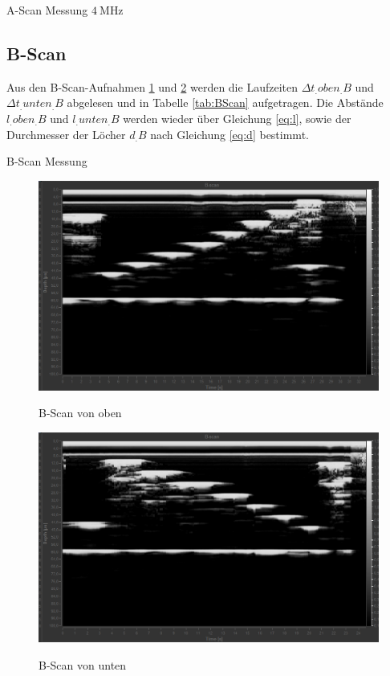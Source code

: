 \begin{table}
	\centering
	\caption{A-Scan Messung $\SI{4}{\mega\hertz}$}
	
	\label{tab:AScan4MHz}
\end{table}

\subsection{B-Scan}

Aus den B-Scan-Aufnahmen \ref{fig:B-Scan-oben} und \ref{fig:B-Scan-unten} werden die Laufzeiten $\Delta t_.{oben_.B}$ und $\Delta t_.{unten_.B}$ abgelesen und in Tabelle \ref{tab:BScan} aufgetragen. Die Abstände $l_.{oben_.B}$ und $l_.{unten_.B}$ werden wieder über Gleichung \eqref{eq:l}, sowie der Durchmesser der Löcher $d_.B$ nach Gleichung \eqref{eq:d} bestimmt.
\begin{table}
	\centering
	\caption{B-Scan Messung}
	
	\label{tab:BScan}
\end{table}

\begin{figure}
	\centering
	\caption{B-Scan von oben}
	\includegraphics[width=\linewidth-40pt,height=\textheight-40pt,keepaspectratio]{content/images/B-Scan-oben.jpg}
	\label{fig:B-Scan-oben}
\end{figure}

\begin{figure}
	\centering
	\caption{B-Scan von unten}
	\includegraphics[width=\linewidth-40pt,height=\textheight-40pt,keepaspectratio]{content/images/B-Scan-unten.jpg}
	\label{fig:B-Scan-unten}
\end{figure}

